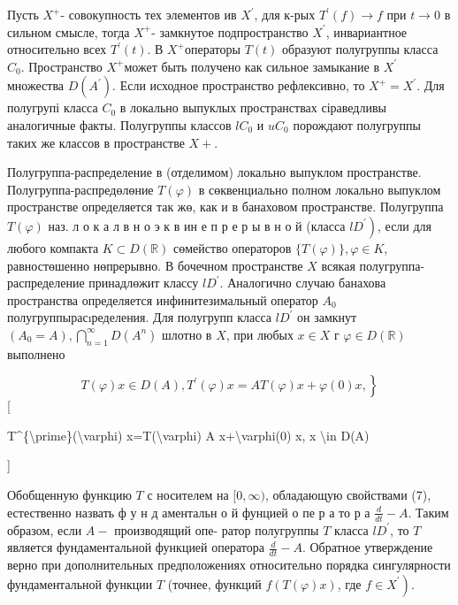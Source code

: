 \documentclass[10pt]{article}
\begin{document}
Пусть $X^{+}$- совокупность тех элементов ив $X^{\prime}$, для к-рых $T^{\prime}(f) \rightarrow f$ при $t \rightarrow 0$ в сильном смысле, тогда $X^{+}$- замкнутое подпространство $X^{\prime}$, инвариантное относительно всех $T^{\prime}(t)$. В $X^{+}$операторы $T(t)$ образуют полугруппы класса $C_{0}$. Пространство $X^{+}$может быть получено как сильное замыкание в $X^{\prime}$ множества $D\left(A^{\prime}\right)$. Если исходное пространство рефлексивно, то $X^{+}=X^{\prime}$. Для полугрупі класса $C_{0}$ в локально выпуклых пространствах сіраведливы аналогичные факты. Полугруппы классов $l C_{0}$ и $u C_{0}$ порождают полугруппы таких же классов в пространстве $X+$.



Полугруппа-распределение в (отделимом) локально выпуклом пространстве. Полугруппа-распредөлөние $T(\varphi)$ в сөквенциально полном локально выпуклом пространстве определяется так жө, как и в банаховом пространстве. Полугруппа $T(\varphi)$ наз. л о к а л в н о э к в ин е п р е р ы в н о й (класса $\left.l D^{\prime}\right)$, если для любого компакта $K \subset D(\mathbb{R})$ сөмейство операторов $\{T(\varphi)\}, \varphi \in K$, равностөшенно нөпрерывно. В бочечном пространстве $X$ всякая полугруппа-распределение принадлөжит классу $l D^{\prime}$. Аналогично случаю банахова пространства определяется инфинитезимальный оператор $A_{0}$ полугруппырасıределения. Для полугрупп класса $l D^{\prime}$ он замкнут $\left(A_{0}=A\right), \bigcap_{n=1}^{\infty} D\left(A^{n}\right)$ шлотно в $X$, при любых $x \in X$ г $\varphi \in D(\mathbb{R})$ выполнено



\[

\left.T(\varphi) x \in D(A), T^{\prime}(\varphi) x=A T(\varphi) x+\varphi(0) x,\right\}

\][



T\^{}\{\textbackslash prime\}(\textbackslash varphi) x=T(\textbackslash varphi) A x+\textbackslash varphi(0) x, x \textbackslash in D(A)

]



Обобщенную функцию $T$ с носителем на $[0, \infty)$, обладающую свойствами (7), естественно назвать ф у н д аментальн о й фунцией о пе р а то р а $\frac{d}{d t}-A$. Таким образом, если $A-$ производящий опе- ратор полугруппы $T$ класса $l D^{\prime}$, то $T$ является фундаментальной функцией оператора $\frac{d}{d t}-A$. Обратное утверждение верно при дополнительных предположениях относительно порядка сингулярности фундаментальной функции $T$ (точнее, функций $f(T(\varphi) x)$, где $\left.f \in X^{\prime}\right)$.
\end{document}
